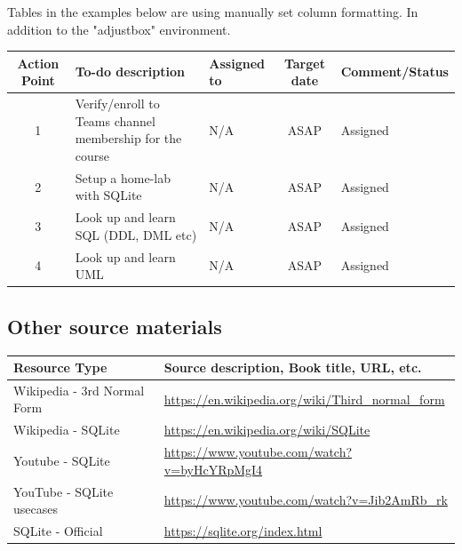 {\begin{notes}
    Tables in the examples below are using manually set column formatting. In addition to the "adjustbox" environment.
\end{notes}

\begin{adjustbox}{max width=\textwidth}
    \begin{tabular}{c|l|l|c|l}
        {\bfseries{Action Point}} & {\bfseries{To-do description}} & {\bfseries{Assigned to}} & {\bfseries{Target date}} & {\bfseries{Comment/Status}} \\
        \hline
        1 & Verify/enroll to Teams channel membership for the course & N/A & ASAP & Assigned \\ \hline
        2 & Setup a home-lab with SQLite & N/A & ASAP & Assigned \\ \hline
        3 & Look up and learn SQL (DDL, DML etc) & N/A & ASAP & Assigned \\ \hline
        4 & Look up and learn UML & N/A & ASAP & Assigned \\ \hline
    \end{tabular}
\end{adjustbox}




\subsection{Other source materials} \label{subsec:source}

\begin{tabular}{p{40mm} | p{120mm}}
    {\bfseries{Resource Type}} & {\bfseries{Source description, Book title, URL, etc.}}\\
    \hline
    Wikipedia - 3rd Normal Form & \url{https://en.wikipedia.org/wiki/Third_normal_form}\\ \hline
    Wikipedia - SQLite & \url{https://en.wikipedia.org/wiki/SQLite}\\ \hline
    Youtube - SQLite & \url{https://www.youtube.com/watch?v=byHcYRpMgI4}\\ \hline
    YouTube - SQLite usecases & \url{https://www.youtube.com/watch?v=Jib2AmRb_rk}\\ \hline
    SQLite - Official & \url{https://sqlite.org/index.html}\\ \hline
\end{tabular}

}
